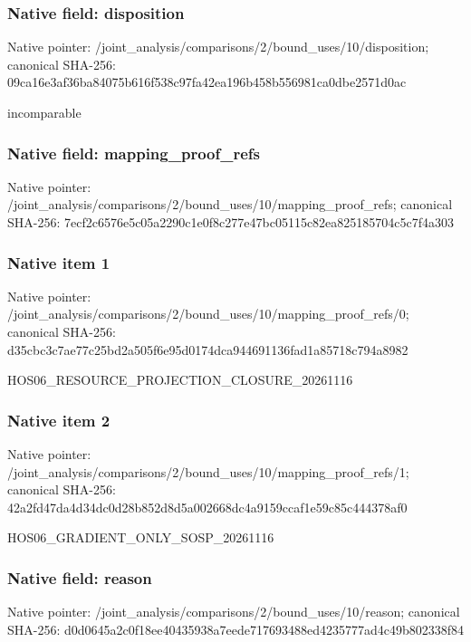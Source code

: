 \documentclass[10pt,a4paper]{article}
\begin{document}
\subsubsection{Native field: disposition}
Native pointer: /joint\_\allowbreak{}analysis/comparisons/2/bound\_\allowbreak{}uses/10/disposition; canonical SHA-256: 09ca16e3af36ba84075b616f538c97fa42ea196b458b556981ca0dbe2571d0ac

\begingroup\raggedright\sloppy incomparable\par\endgroup

\subsubsection{Native field: mapping\_\allowbreak{}proof\_\allowbreak{}refs}
Native pointer: /joint\_\allowbreak{}analysis/comparisons/2/bound\_\allowbreak{}uses/10/mapping\_\allowbreak{}proof\_\allowbreak{}refs; canonical SHA-256: 7ecf2c6576e5c05a2290c1e0f8c277e47bc05115c82ea825185704c5c7f4a303

\subsubsection{Native item 1}
Native pointer: /joint\_\allowbreak{}analysis/comparisons/2/bound\_\allowbreak{}uses/10/mapping\_\allowbreak{}proof\_\allowbreak{}refs/0; canonical SHA-256: d35cbc3c7ae77c25bd2a505f6e95d0174dca944691136fad1a85718c794a8982

\begingroup\raggedright\sloppy HOS06\_\allowbreak{}RESOURCE\_\allowbreak{}PROJECTION\_\allowbreak{}CLOSURE\_\allowbreak{}20261116\par\endgroup

\subsubsection{Native item 2}
Native pointer: /joint\_\allowbreak{}analysis/comparisons/2/bound\_\allowbreak{}uses/10/mapping\_\allowbreak{}proof\_\allowbreak{}refs/1; canonical SHA-256: 42a2fd47da4d34dc0d28b852d8d5a002668dc4a9159ccaf1e59c85c444378af0

\begingroup\raggedright\sloppy HOS06\_\allowbreak{}GRADIENT\_\allowbreak{}ONLY\_\allowbreak{}SOSP\_\allowbreak{}20261116\par\endgroup

\subsubsection{Native field: reason}
Native pointer: /joint\_\allowbreak{}analysis/comparisons/2/bound\_\allowbreak{}uses/10/reason; canonical SHA-256: d0d0645a2c0f18ee40435938a7eede717693488ed4235777ad4c49b802338f84
\end{document}
